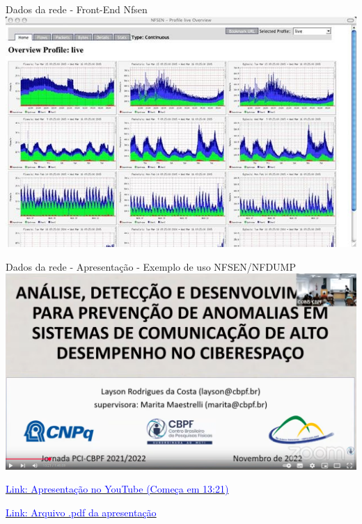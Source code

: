 \begin{frame}{Dados da rede - Front-End Nfsen}
    \centering
    \includegraphics[width=0.75\linewidth]{Figuras/front-end-nfsen.png}
    \vspace{0.3cm}




\end{frame}


\begin{frame}{Dados da rede - Apresentação - Exemplo de uso NFSEN/NFDUMP}
    \centering
    \includegraphics[width=0.75\linewidth]{Figuras/apresentacao-nfdump-nfsen-layson.png}
    \vspace{0.3cm}


\href{https://www.youtube.com/watch?v=vmK7_SBREm4}{\textcolor{blue}{Link: Apresentação no YouTube (Começa em 13:21)}}

\href{https://www.gov.br/cbpf/pt-br/pesquisa-e-desenvolvimento/capacitacao-institucional-pci/jornada/apresentacaolaysonrodrigues.pdf}{\textcolor{blue}{Link: Arquivo .pdf da apresentação}}

\end{frame}


